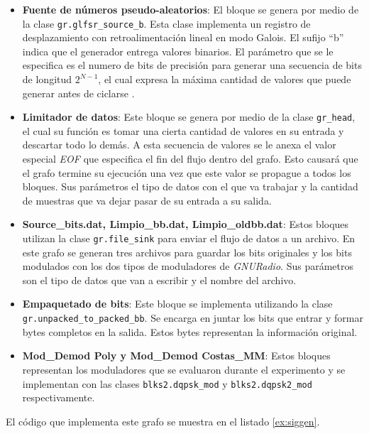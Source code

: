 \begin{itemize}
  \item \textbf{Fuente de n\'umeros pseudo-aleatorios}: El bloque se genera por medio de la clase
  \verb|gr.glfsr_source_b|. Esta clase implementa un registro de desplazamiento con
  retroalimentaci\'on lineal en modo Galois. El sufijo ``b'' indica que el generador entrega valores
  binarios. El par\'ametro que se le especifica es el numero de bits de precisi\'on para generar
  una secuencia de bits de longitud $2^{N-1}$, el cual expresa la m\'axima cantidad de valores
  que puede generar antes de ciclarse \cite{xilinx}. 
  \item \textbf{Limitador de datos}: Este bloque se genera por medio de la clase \verb|gr_head|, el
  cual su funci\'on es tomar una cierta cantidad de valores en su entrada y descartar todo lo
  dem\'as. A esta secuencia de valores se le anexa el valor especial \emph{EOF} que especifica el
  fin del flujo dentro del grafo. Esto causar\'a que el grafo termine su ejecuci\'on una vez que
  este valor se propague a todos los bloques. Sus par\'ametros el tipo de datos con el que va
  trabajar y la cantidad de muestras que va dejar pasar de su entrada a su salida.
  \item \textbf{Source\_bits.dat, Limpio\_bb.dat, Limpio\_oldbb.dat}: Estos bloques utilizan la
  clase \verb|gr.file_sink| para enviar el flujo de datos a un archivo. En este grafo se generan tres
  archivos para guardar los bits originales y los bits modulados con los dos tipos de moduladores
  de \emph{GNURadio}. Sus par\'ametros son el tipo de datos que van a escribir y el nombre del
  archivo.
  \item \textbf{Empaquetado de bits}: Este bloque se implementa utilizando la clase \\
  \verb|gr.unpacked_to_packed_bb|. Se encarga en juntar los bits que entrar y formar bytes completos
  en la salida. Estos bytes representan la informaci\'on original.
  \item \textbf{Mod\_Demod Poly y Mod\_Demod Costas\_MM}: Estos bloques representan los moduladores
  que se evaluaron durante el experimento y se implementan con las clases \verb|blks2.dqpsk_mod| y
  \verb|blks2.dqpsk2_mod| respectivamente.
\end{itemize}

El c\'odigo que implementa este grafo se muestra en el listado \ref{ex:siggen}.

